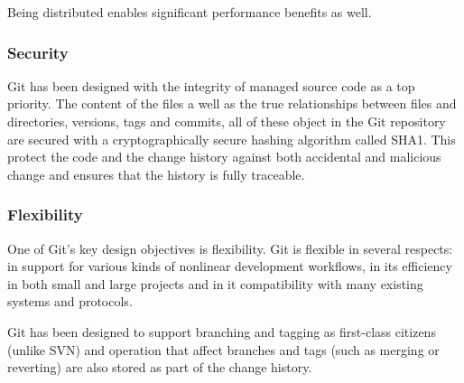\documentclass[11pt]{article}
\begin{document}
Being distributed enables significant performance benefits as well.

\subsubsection{Security}
\label{sec-1-3-2}
Git has been designed with the integrity of managed source code as a top priority. The content of the files a well as the true relationships between files and directories, versions, tags and commits, all of these object in the Git repository are secured with a cryptographically secure hashing algorithm called SHA1. This protect the code and the change history against both accidental and malicious change and ensures that the history is fully traceable.

\subsubsection{Flexibility}
\label{sec-1-3-3}
One of Git's key design objectives is flexibility. Git is flexible in several respects: in support for various kinds of nonlinear development workflows, in its efficiency in both small and large projects and in it compatibility with many existing systems and protocols.

Git has been designed to support branching and tagging as first-class citizens (unlike SVN) and operation that affect branches and tags (such as merging or reverting) are also stored as part of the change history.
\end{document}
